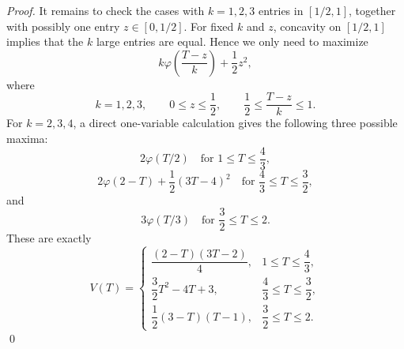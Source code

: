 \documentclass[10pt,a4paper]{amsart}
\begin{document}
\begin{proof}
It remains to check the cases with \(k=1,2,3\) entries in \([1/2,1]\), together
with possibly one entry \(z\in[0,1/2]\).  For fixed \(k\) and \(z\), concavity on
\([1/2,1]\) implies that the \(k\) large entries are equal.  Hence we only need
to maximize
\[
k\varphi\left(\frac{T-z}{k}\right)+\frac12z^2,
\]
where
\[
k=1,2,3,\qquad
0\le z\le\frac12,
\qquad
\frac12\le\frac{T-z}{k}\le 1.
\]
\fi
For $k=2,3,4$, a direct one-variable calculation gives the following three possible maxima:
\[
2\varphi(T/2)
\quad
\text{for }
1\le T\le \frac43,
\]
\[
2\varphi(2-T)+\frac12(3T-4)^2
\quad
\text{for }
\frac43\le T\le \frac32,
\]
and
\[
3\varphi(T/3)
\quad
\text{for }
\frac32\le T\le 2.
\]
These are exactly
\[
V(T)=
\begin{cases}
\dfrac{(2-T)(3T-2)}{4},
& 1\le T\le \dfrac43,\\[8pt]
\dfrac32T^2-4T+3,
& \dfrac43\le T\le \dfrac32,\\[8pt]
\dfrac12(3-T)(T-1),
& \dfrac32\le T\le 2.
\end{cases}
\]\qed
\end{proof}
\end{document}

